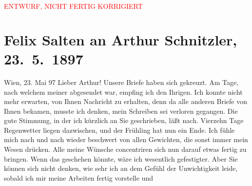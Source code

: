 
\begin{center}
            \textcolor{red}{ENTWURF, NICHT FERTIG KORRIGIERT}
                      \end{center}
            
         
         \renewcommand{\erwaehntePersonen}{Personen: Richard Beer-Hofmann,  Elisabeth von Österreich-Ungarn,  Franz Joseph I. von Österreich-Ungarn, Hugo von Hofmannsthal, Richard Metzl, Louise Metzl, Ottilie Salten, Adele Sandrock}
         \renewcommand{\erwaehnteInstitutionen}{Institutionen: Franz-Joseph-Orden}
         \renewcommand{\erwaehnteOrte}{Orte: Ostsee, Paris, Riga, Russland, Wien}
         \renewcommand{\erwaehnteWerke}{}
               \section[Felix Salten an Arthur Schnitzler, 23. 5. 1897]{ Felix Salten an Arthur Schnitzler, 23. 5. 1897}\nopagebreak{}\rehead{ }\begin{ledgroupsized}[t]{13cm}\normalsize\beginnumbering \toendnotes[C]{\smallbreak\pagebreak[2]} 
\toendnotes[C]{\smallbreak}\pstart
           {\pb}Wien, 23. Mai 97\pend
           \pstart
           Lieber Arthur! Unsere Briefe haben sich gekreuzt. Am Tage, nach
               welchem meiner abgesendet war, empfing ich den Ihrigen. Ich konnte nicht mehr
               erwarten, von Ihnen Nachricht zu erhalten, denn da alle anderen Briefe von Ihnen
               bekamen, musste ich denken, mein Schreiben sei verloren gegangen. \pend
           \pstart
           Die gute Stimmung, in der ich kürzlich an Sie geschrieben, läßt nach. Vierzehn Tage
               Regenwetter liegen dazwischen, und der Frühling hat nun ein Ende. Ich fühle mich nach
               und nach wieder beschwert von allen Gewichten, die sonst immer mein Wesen drücken.
               Alle meine Wünsche concentriren sich nun darauf etwas fertig zu bringen. Wenn das
               geschehen könnte, wäre ich wesentlich gefestigter. Aber Sie können sich nicht denken,
               wie sehr ich an dem Gefühl der Unwichtigkeit leide, sobald ich mir meine {\pb}Arbeiten fertig vorstelle und

\end{ledgroupsized}
